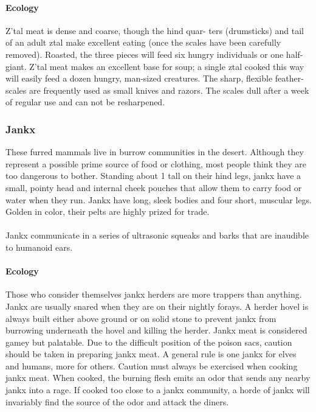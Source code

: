 \paragraph{Ecology}
Z'tal meat is dense and coarse, though the hind quar-
ters (drumsticks) and tail of an adult ztal make excellent eating
(once the scales have been carefully removed). Roasted, the
three pieces will feed six hungry individuals or one half-giant.
Z'tal meat makes an excellent base for soup; a single ztal
cooked this way will easily feed a dozen hungry, man-sized
creatures. The sharp, flexible feather-scales are frequently
used as small knives and razors. The scales dull after a week
of regular use and can not be resharpened.

\subsubsection{Jankx}
These furred mammals live in burrow communities in the desert.
Although they represent a possible prime source of food or
clothing, most people think they are too dangerous to bother.
Standing about 1 tall on their hind legs, jankx have a small,
pointy head and internal cheek pouches that allow them to carry
food or water when they run. Jankx have long, sleek bodies
and four short, muscular legs. Golden in color, their pelts are
highly prized for trade.\\
\\
Jankx communicate in a series of ultrasonic squeaks and
barks that are inaudible to humanoid ears.

\paragraph{Ecology}
Those who consider themselves jankx herders are
more trappers than anything. Jankx are usually snared when
they are on their nightly forays. A herder hovel is always built
either above ground or on solid stone to prevent jankx from
burrowing underneath the hovel and killing the herder. Jankx
meat is considered gamey but palatable. Due to the difficult
position of the poison sacs, caution should be taken in preparing
jankx meat. A general rule is one jankx for elves and humans,
more for others. Caution must always be exercised when cooking
jankx meat. When cooked, the burning flesh emits an odor
that sends any nearby jankx into a rage. If cooked too close to a
jankx community, a horde of jankx will invariably find the
source of the odor and attack the diners.
